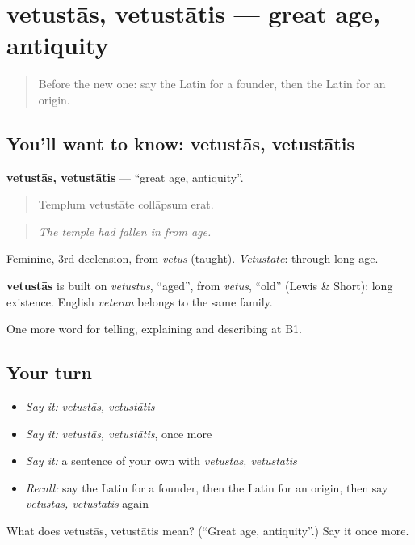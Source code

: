 \section[vetustās, vetustātis]{vetustās, vetustātis — great age, antiquity}

\label{lesson:LA-C344-vetustas}



\begin{quote}
Before the new one: say the Latin for a founder, then the Latin for an origin.
\end{quote}

\subsection*{You'll want to know: vetustās, vetustātis}
\textbf{vetustās, vetustātis} — \textquotedblleft{}great age, antiquity\textquotedblright{}.

\begin{quote}
Templum vetustāte collāpsum erat.
\end{quote}

\begin{quote}
\emph{The temple had fallen in from age.}
\end{quote}

Feminine, 3rd declension, from \emph{vetus} (taught). \emph{Vetustāte}: through long age.

\begin{cousinweb}
\textbf{vetustās} is built on \emph{vetustus}, \textquotedblleft{}aged\textquotedblright{}, from \emph{vetus}, \textquotedblleft{}old\textquotedblright{} (Lewis \& Short): long existence. English \emph{veteran} belongs to the same family.
\end{cousinweb}

\begin{grammarlens}[title={What you've built}]
One more word for telling, explaining and describing at B1.
\end{grammarlens}

\subsection*{Your turn}
\begin{itemize}
\raggedright
  \item \emph{Say it:} \emph{vetustās, vetustātis}
  \item \emph{Say it:} \emph{vetustās, vetustātis}, once more
  \item \emph{Say it:} a sentence of your own with \emph{vetustās, vetustātis}
  \item \emph{Recall:} say the Latin for a founder, then the Latin for an origin, then say \emph{vetustās, vetustātis} again
\end{itemize}

\begin{tcolorbox}[breakable,colback=teal!4,colframe=teal!35!black,title={Before you move on}]
What does vetustās, vetustātis mean? (\textquotedblleft{}Great age, antiquity\textquotedblright{}.) Say it once more.
\end{tcolorbox}
